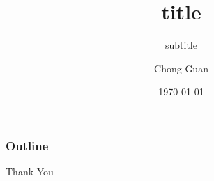 \documentclass{beamer}
\title{title}
\subtitle{subtitle}
\author{Chong Guan}
\date{\today}
\institute{\url{guanchong@iie.ac.cn}}
\begin{document}
\begin{frame}[plain,t]
\titlepage
\end{frame}

\begin{frame}%
	\frametitle{Outline}
\tableofcontents
\end{frame}



\begin{frame}[c]

\begin{center}
\Huge Thank You
\end{center}

\end{frame}

\end{document}
